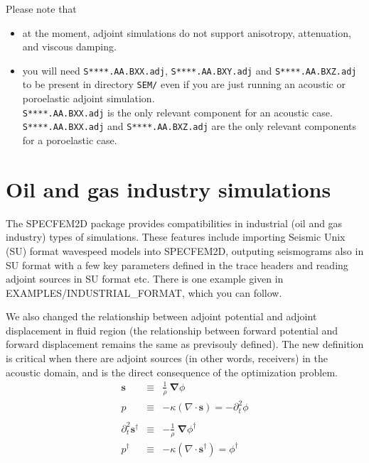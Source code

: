 \documentclass[oneside,english,onecolumn,letterpaper]{book}
\begin{document}
Please note that
\begin{itemize}
\item at the moment, adjoint simulations do not support anisotropy, attenuation, and viscous damping.

\item you will need \texttt{S****.AA.BXX.adj}, \texttt{S****.AA.BXY.adj} and \texttt{S****.AA.BXZ.adj}
to be present in directory \texttt{SEM/} even if you are just running an acoustic or
poroelastic adjoint simulation.\\
\texttt{S****.AA.BXX.adj} is the only relevant component for an acoustic case.\\
\texttt{S****.AA.BXX.adj} and \texttt{S****.AA.BXZ.adj} are the only relevant components for a
poroelastic case.
\end{itemize}



\chapter{Oil and gas industry simulations}


The SPECFEM2D package provides compatibilities in industrial (oil and gas industry) types of simulations.
These features include importing Seismic Unix (SU) format wavespeed models into SPECFEM2D,
outputing seismograms also in SU format with a few key parameters defined in the trace headers
and reading adjoint sources in SU format etc.
There is one example given in EXAMPLES/INDUSTRIAL\_FORMAT, which you can follow.

We also changed the relationship between adjoint potential and adjoint displacement in fluid region
(the relationship between forward potential and forward displacement remains the same as previsouly defined).
The new definition is critical when there are adjoint sources (in other words, receivers) in the acoustic domain,
and is the direct consequence of the optimization problem.
\begin{eqnarray*}
\mathbf{s}&\equiv&\frac{1}{\rho}~\mathbf{\nabla}\phi \\
p&\equiv&-\kappa(\nabla\cdot\mathbf{s}) =-\partial_t^2\phi \\
\quad\\
\partial_t^2\mathbf{s}^\dagger&\equiv&-\frac{1}{\rho}~\mathbf{\nabla}\phi^\dagger\\
p^\dagger&\equiv&-\kappa(\nabla\cdot\mathbf{s}^\dagger)=\phi^\dagger
\end{eqnarray*}
\end{document}
